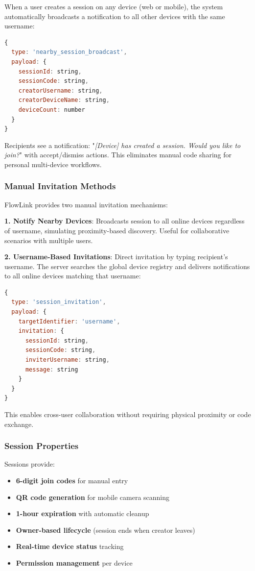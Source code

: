 \documentclass[conference]{IEEEtran}
\begin{document}
When a user creates a session on any device (web or mobile), the system automatically broadcasts a notification to all other devices with the same username:

\begin{lstlisting}[language=JavaScript, basicstyle=\tiny]
{
  type: 'nearby_session_broadcast',
  payload: {
    sessionId: string,
    sessionCode: string,
    creatorUsername: string,
    creatorDeviceName: string,
    deviceCount: number
  }
}
\end{lstlisting}

Recipients see a notification: "\textit{[Device] has created a session. Would you like to join?}" with accept/dismiss actions. This eliminates manual code sharing for personal multi-device workflows.

\subsubsection{Manual Invitation Methods}

FlowLink provides two manual invitation mechanisms:

\textbf{1. Notify Nearby Devices}: Broadcasts session to all online devices regardless of username, simulating proximity-based discovery. Useful for collaborative scenarios with multiple users.

\textbf{2. Username-Based Invitations}: Direct invitation by typing recipient's username. The server searches the global device registry and delivers notifications to all online devices matching that username:

\begin{lstlisting}[language=JavaScript, basicstyle=\tiny]
{
  type: 'session_invitation',
  payload: {
    targetIdentifier: 'username',
    invitation: {
      sessionId: string,
      sessionCode: string,
      inviterUsername: string,
      message: string
    }
  }
}
\end{lstlisting}

This enables cross-user collaboration without requiring physical proximity or code exchange.

\subsubsection{Session Properties}

Sessions provide:
\begin{itemize}
    \item \textbf{6-digit join codes} for manual entry
    \item \textbf{QR code generation} for mobile camera scanning
    \item \textbf{1-hour expiration} with automatic cleanup
    \item \textbf{Owner-based lifecycle} (session ends when creator leaves)
    \item \textbf{Real-time device status} tracking
    \item \textbf{Permission management} per device
\end{itemize}
\end{document}
